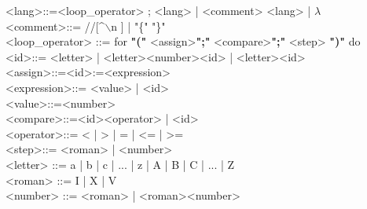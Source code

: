 \documentclass[12pt]{report}
\begin{document}
\text{}\newline
<lang>::=<loop\_operator> ; <lang> | <comment> <lang> |  $\lambda$ \\
<comment>::= //[\^ \space $\backslash$n ] | "\{" \space [ \^ \space]\space "\}" \\
<loop\_operator> ::= for \textbf{"("} <assign>\textbf{";"} <compare>\textbf{";"}  <step> \textbf{")"} do  \\
<id>::= <letter> | <letter><number><id> | <letter><id>\\
<assign>::=<id>:=<expression>\\
<expression>::= <value> | <id>\\
<value>::=<number>\\
<compare>::=<id><operator> | <id> \\
<operator>::= < | > | = | <= | >=\\
<step>::= <roman> | <number>\\
<letter> ::= a | b | c | ... | z | A | B | C | ... | Z \\
<roman> ::= I | X | V \\
<number> ::= <roman> | <roman><number> \\
\end{document}
